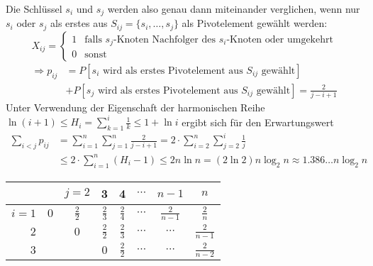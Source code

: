 Die Schlüssel $s_i$ und $s_j$ werden also genau dann miteinander verglichen,
wenn nur $s_i$ oder $s_j$ als erstes aus $S_{ij} = \{ s_i, \dots, s_j \}$ als
Pivotelement gewählt werden:
\[
  X_{ij} = \begin{cases} 1 & \text{falls $s_j$-Knoten Nachfolger des
  $s_i$-Knoten oder umgekehrt} \\ 0 & \text{sonst} \end{cases}
\]
\begin{align*}
  \Rightarrow p_{ij} &= P\left[s_i \text{ wird als erstes Pivotelement aus $S_{ij}$ gewählt}\right] \\
  &+ P\left[s_j \text{ wird als erstes Pivotelement aus $S_{ij}$ gewählt}\right] = \frac{2}{j-i+1}
\end{align*}
Unter Verwendung der Eigenschaft der harmonischen Reihe $\ln(i+1) \leq H_i =
\sum_{k=1}^i \frac{1}{k} \leq 1 + \ln i$ ergibt sich für den Erwartungswert
\begin{align*}
	\sum_{i<j} p_{ij} &= \sum_{i=1}^n \sum_{j=1}^n \frac{2}{j-i+1} = 2 \cdot \sum_{i=2}^n \sum_{j=2}^i \frac{1}{j} \\
			  &\leq 2 \cdot \sum_{i=1}^n \left(H_i - 1\right) \leq 2 n \ln n = (2 \ln 2) n \log_2 n \approx 1.386\dots n \log_2 n
\end{align*}
\renewcommand\arraystretch{1.5}
\begin{tabular}{r|ccccccc}
	& & $j = 2$ & 3 & 4 & $\cdots$ & $n-1$ & $n$ \\
	\hline
	$i = 1$ & $0$ & $\frac{2}{2}$ & $\frac{2}{3}$ & $\frac{2}{4}$ & $\cdots$ & $\frac{2}{n-1}$ & $\frac{2}{n}$ \\
	$2$ && $0$ & $\frac{2}{2}$ & $\frac{2}{3}$ & $\cdots$ & $\cdots$ & $\frac{2}{n-1}$ \\
	$3$ &&& $0$ & $\frac{2}{2}$ & $\cdots$ & $\cdots$ & $\frac{2}{n-2}$
\end{tabular}
